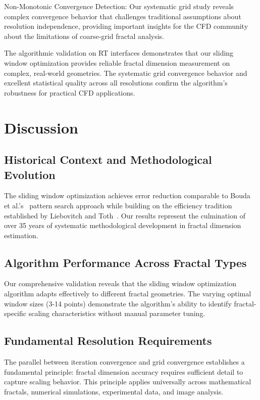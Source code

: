 \documentclass[preprint,12pt]{elsarticle}
\def\textbf#1{#1}%
\begin{document}
\textbf{Non-Monotonic Convergence Detection}: Our systematic grid study reveals complex convergence behavior that challenges traditional assumptions about resolution independence, providing important insights for the CFD community about the limitations of coarse-grid fractal analysis.

The algorithmic validation on RT interfaces demonstrates that our sliding window optimization provides reliable fractal dimension measurement on complex, real-world geometries. The systematic grid convergence behavior and excellent statistical quality across all resolutions confirm the algorithm's robustness for practical CFD applications.


\section{Discussion}
\label{sec:discussion}

\subsection{Historical Context and Methodological Evolution}

The sliding window optimization achieves error reduction comparable to Bouda et al.'s~\cite{bouda2016} pattern search approach while building on the efficiency tradition established by Liebovitch and Toth~\cite{liebovitch1989}. Our results represent the culmination of over 35 years of systematic methodological development in fractal dimension estimation.

\subsection{Algorithm Performance Across Fractal Types}

Our comprehensive validation reveals that the sliding window optimization algorithm adapts effectively to different fractal geometries. The varying optimal window sizes (3-14 points) demonstrate the algorithm's ability to identify fractal-specific scaling characteristics without manual parameter tuning.

\subsection{Fundamental Resolution Requirements}

The parallel between iteration convergence and grid convergence establishes a fundamental principle: \textbf{fractal dimension accuracy requires sufficient detail to capture scaling behavior}. This principle applies universally across mathematical fractals, numerical simulations, experimental data, and image analysis.
\end{document}
